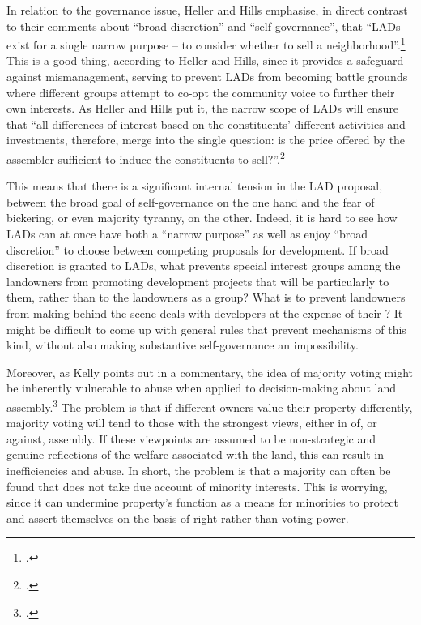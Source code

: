 In relation to the governance issue, Heller and Hills emphasise, in direct contrast to their comments about ``broad discretion'' and ``self-governance'', that ``LADs exist for a single narrow purpose -- to consider whether to sell a neighborhood''.\footcite[See][1500]{heller08} This is a good thing, according to Heller and Hills, since it provides a safeguard against mismanagement, serving to prevent LADs from becoming battle grounds where different groups attempt to co-opt the community voice to further their own interests. As Heller and Hills put it, the narrow scope of LADs will ensure that ``all differences of interest based on the constituents' different activities and investments, therefore, merge into the single question: is the price offered by the assembler sufficient to induce the constituents to sell?''.\footcite[1500]{heller08}

This means that there is a significant internal tension in the LAD proposal, between the broad goal of self-governance on the one hand and the fear of  bickering, or even majority tyranny, on the other. Indeed, it is hard to see how LADs can at once have both a ``narrow purpose'' as well as enjoy ``broad discretion'' to choose between competing proposals for development. If broad discretion is granted to LADs, what prevents special interest groups among the landowners from promoting development projects that will be particularly  to them, rather than to the landowners as a group? What is to prevent landowners from making behind-the-scene deals with  developers at the expense of their ? It might be difficult to come up with general rules that prevent mechanisms of this kind, without also making substantive self-governance an impossibility.

Moreover, as Kelly points out in a commentary, the idea of majority voting might be inherently vulnerable to abuse when applied to  decision-making about land assembly.\footcite{kelly09} The problem is that if different owners value their property differently, majority voting will tend to  those with the strongest views, either in  of, or against, assembly. If these viewpoints are assumed to be non-strategic and genuine reflections of the welfare associated with the land, this can result in inefficiencies and abuse. In short, the problem is that a majority can often be found that does not take due account of minority interests. This is worrying, since it can undermine property's function as a means for minorities to protect and assert themselves on the basis of right rather than voting power.

